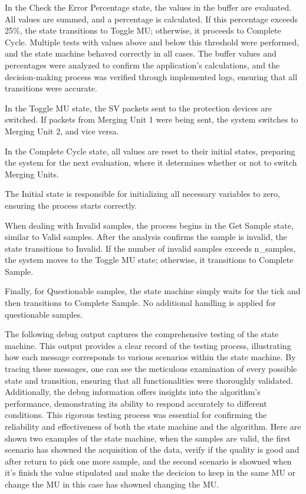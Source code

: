 In the Check the Error Percentage state, the values in the buffer are evaluated. All values are summed, and a percentage is calculated. If this percentage exceeds 25\%, the state transitions to Toggle MU; otherwise, it proceeds to Complete Cycle. Multiple tests with values above and below this threshold were performed, and the state machine behaved correctly in all cases. The buffer values and percentages were analyzed to confirm the application's calculations, and the decision-making process was verified through implemented logs, ensuring that all transitions were accurate.

In the Toggle MU state, the SV packets sent to the protection devices are switched. If packets from Merging Unit 1 were being sent, the system switches to Merging Unit 2, and vice versa.

In the Complete Cycle state, all values are reset to their initial states, preparing the system for the next evaluation, where it determines whether or not to switch Merging Units.

The Initial state is responsible for initializing all necessary variables to zero, ensuring the process starts correctly.

When dealing with Invalid samples, the process begins in the Get Sample state, similar to Valid samples. After the analysis confirms the sample is invalid, the state transitions to Invalid. If the number of invalid samples exceeds n\_samples, the system moves to the Toggle MU state; otherwise, it transitions to Complete Sample.

Finally, for Questionable samples, the state machine simply waits for the tick and then transitions to Complete Sample. No additional handling is applied for questionable samples.

The following debug output captures the comprehensive testing of the state machine. This output provides a clear record of the testing process, illustrating how each message corresponds to various scenarios within the state machine. By tracing these messages, one can see the meticulous examination of every possible state and transition, ensuring that all functionalities were thoroughly validated. Additionally, the debug information offers insights into the algorithm's performance, demonstrating its ability to respond accurately to different conditions. This rigorous testing process was essential for confirming the reliability and effectiveness of both the state machine and the algorithm. Here are shown two examples of the state machine, when the samples are valid, the first scenario has showned the acquisition of the data, verify if the quality is good and after return to pick one more sample, and the second scenario is showned when it's finish the value stipulated and make the decicion to keep in the same MU or change the MU in this case has showned changing the MU. 

